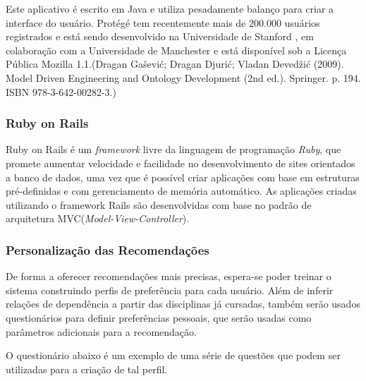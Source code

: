 	Este aplicativo é escrito em Java e utiliza pesadamente balanço para criar a interface do usuário. Protégé tem recentemente mais de 200.000 usuários registrados e está sendo desenvolvido na Universidade de Stanford , em colaboração com a Universidade de Manchester e está disponível sob a Licença Pública Mozilla 1.1.(Dragan Gašević; Dragan Djurić; Vladan Devedžić (2009). Model Driven Engineering and Ontology Development (2nd ed.). Springer. p. 194. ISBN 978-3-642-00282-3.)

\subsubsection{Ruby on Rails}

	Ruby on Rails é um \textit{framework} livre da linguagem de programação \textit{Ruby}, que promete aumentar velocidade e facilidade no desenvolvimento de sites orientados a banco de dados, uma vez que é possível criar aplicações com base em estruturas pré-definidas e com gerenciamento de memória automático. As aplicações criadas utilizando o framework Rails são desenvolvidas com base no padrão de arquitetura MVC(\textit{Model-View-Controller}).

\subsubsection{Personalização das Recomendações} %
\label{ssub:personaliza_o_das_recomenda_es}

	De forma a oferecer recomendações mais precisas, espera-se poder treinar o sistema construindo perfis de preferência para cada usuário. Além de inferir relações de dependência a partir das disciplinas já cursadas, também serão usados questionários para definir preferências pessoais, que serão usadas como parâmetros adicionais para a recomendação.

	O questionário abaixo é um exemplo de uma série de questões que podem ser utilizadas para a criação de tal perfil.

